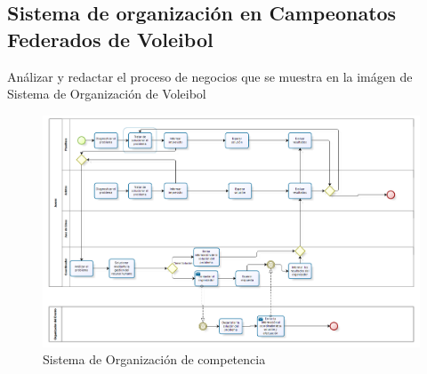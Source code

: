 \documentclass[12pt,letterpaper]{article}
\begin{document}
	\subsection{\textbf{Sistema de organización en Campeonatos Federados de Voleibol}}
	Análizar y redactar el proceso de negocios que se muestra en la imágen de Sistema de Organización de Voleibol
	
	\begin{figure}[H]
		\centering
		\includegraphics[scale=0.43]{img/campeonato.PNG}      
		\caption{Sistema de Organización de competencia }
	\label{fig:rc}
	\end{figure}
\end{document}
